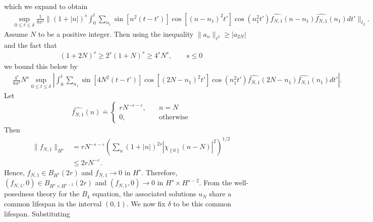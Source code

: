 \documentclass[12pt,reqno]{amsart}
\numberwithin{equation}{section}  %
\newcommand{\wh}{\widehat}
\newcommand{\ee}{\varepsilon}
\begin{document}
%
which we expand to obtain
\begin{equation*}
\begin{split}
& \sup_{0 \le t \le \delta} \frac{1}{8 \pi^{2}}\| (1 + | n |)^{s}
\int_{0}^{t} \sum_{n_{1}} \sin[n^{2}(t-t')] \cos[(n - n_{1})^{2}t']
\cos(n_{1}^{2}t') \wh{f_{N,1}}(n - n_{1})\wh{f_{N,1}}(n_{1}) dt'
\|_{\ell_{2}}.
\end{split}
\end{equation*}
Assume $N$ to be a positive integer. Then 
using the inequality $\| a_{n} \|_{\ell^{2}} \ge
|a_{2N}|$ and the fact that
%
%
\begin{equation*}
\begin{split}
  (1 + 2N)^{s} \ge 2^{s}(1 + N)^{s} \ge
  4^{s} N^{s}, \qquad s \le 0
\end{split}
\end{equation*}
%
%
we bound this below by 
%
%
\begin{equation}
  \label{yut}
\begin{split}
  & \frac{4^{s}}{8\pi^{2}} N^{s} \sup_{0 \le t \le \delta} 
  | \int_{0}^{t} \sum_{n_{1}} \sin[4N^{2}(t-t')] \cos[(2N -n_{1})^{2}t']
\cos(n_{1}^{2}t') \wh{f_{N,1}}(2N - n_{1})\wh{f_{N,1}}(n_{1}) dt' |.
\end{split}
\end{equation}
%
%
%
%
Let
%
%
\begin{equation}
  \label{ill-pos-ce}
\begin{split}
  \wh{f_{N,1}}(n) \doteq
  \begin{cases}
     rN^{-s-\ee},  \quad  & n = N
    \\
     0, \quad  & \text{otherwise}
  \end{cases}
\end{split}
\end{equation}
%
%
Then
%
%
\begin{equation*}
\begin{split}
  \| f_{N,1} \|_{H^{s}}
  & = rN^{-s -\ee} \left( \sum_{n} (1 + | n |)^{2s} |
  \chi_{\left\{0 \right\}} (n - N) |^{2} \right)^{1/2}
  \\
  & \le 2rN^{-\ee}.
\end{split}
\end{equation*}
%
%
Hence, $f_{N,1} \in B_{H^{s}}(2r)$ and $f_{N,1} \to 0$ in $H^{s}$. Therefore,
$(f_{N,1}, 0) \in B_{H^{s} \times H^{s-2}}(2r)$ and $(f_{N,1}, 0) \to 0$ in
$H^{s} \times H^{s-2}$. From the well-posedness theory for the $B_{4}$ equation,
the associated solutions $u_{N}$ share a common lifespan in the interval
$(0, 1)$. We now fix $\delta$ to be this common lifespan. Substituting
\end{document}
